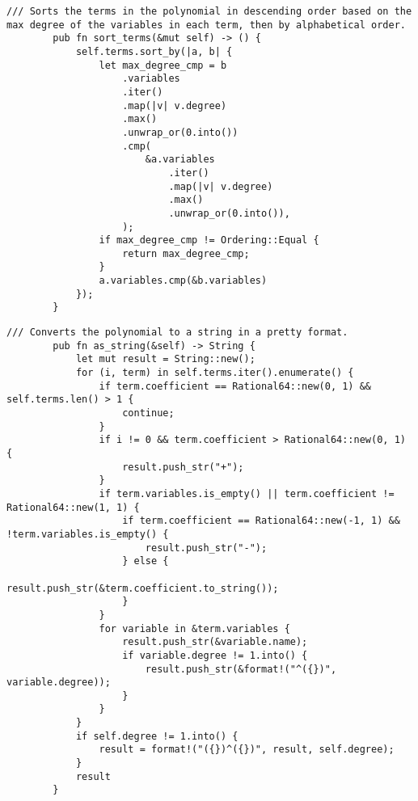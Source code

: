 {    \begin{lstlisting}[caption={The implementation of the \texttt{sort\_terms()} method for the \texttt{Polynomial} struct}, label={lst:polynomial-sort-terms}]
        /// Sorts the terms in the polynomial in descending order based on the max degree of the variables in each term, then by alphabetical order.
        pub fn sort_terms(&mut self) -> () {
            self.terms.sort_by(|a, b| {
                let max_degree_cmp = b
                    .variables
                    .iter()
                    .map(|v| v.degree)
                    .max()
                    .unwrap_or(0.into())
                    .cmp(
                        &a.variables
                            .iter()
                            .map(|v| v.degree)
                            .max()
                            .unwrap_or(0.into()),
                    );
                if max_degree_cmp != Ordering::Equal {
                    return max_degree_cmp;
                }
                a.variables.cmp(&b.variables)
            });
        }
    \end{lstlisting}

    \begin{lstlisting}[caption={The implementation of the \texttt{as\_string()} method for the \texttt{Polynomial} struct}, label={lst:polynomial-as-string}]
        /// Converts the polynomial to a string in a pretty format.
        pub fn as_string(&self) -> String {
            let mut result = String::new();
            for (i, term) in self.terms.iter().enumerate() {
                if term.coefficient == Rational64::new(0, 1) && self.terms.len() > 1 {
                    continue;
                }
                if i != 0 && term.coefficient > Rational64::new(0, 1) {
                    result.push_str("+");
                }
                if term.variables.is_empty() || term.coefficient != Rational64::new(1, 1) {
                    if term.coefficient == Rational64::new(-1, 1) && !term.variables.is_empty() {
                        result.push_str("-");
                    } else {
                        result.push_str(&term.coefficient.to_string());
                    }
                }
                for variable in &term.variables {
                    result.push_str(&variable.name);
                    if variable.degree != 1.into() {
                        result.push_str(&format!("^({})", variable.degree));
                    }
                }
            }
            if self.degree != 1.into() {
                result = format!("({})^({})", result, self.degree);
            }
            result
        }
    \end{lstlisting}

}
